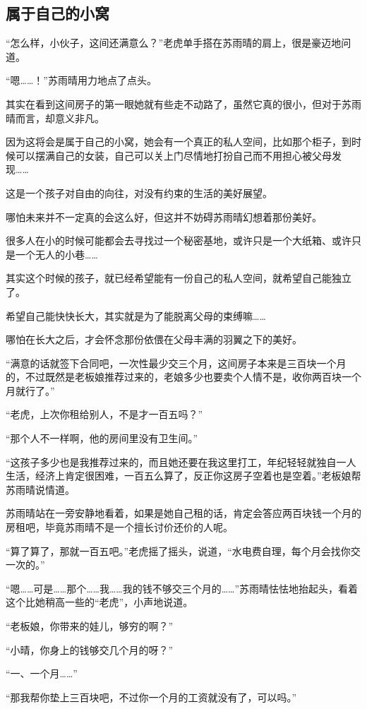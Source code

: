 \subsection{属于自己的小窝}

“怎么样，小伙子，这间还满意么？”老虎单手搭在苏雨晴的肩上，很是豪迈地问道。

“嗯……！”苏雨晴用力地点了点头。

其实在看到这间房子的第一眼她就有些走不动路了，虽然它真的很小，但对于苏雨晴而言，却意义非凡。

因为这将会是属于自己的小窝，她会有一个真正的私人空间，比如那个柜子，到时候可以摆满自己的女装，自己可以关上门尽情地打扮自己而不用担心被父母发现……

这是一个孩子对自由的向往，对没有约束的生活的美好展望。

哪怕未来并不一定真的会这么好，但这并不妨碍苏雨晴幻想着那份美好。

很多人在小的时候可能都会去寻找过一个秘密基地，或许只是一个大纸箱、或许只是一个无人的小巷……

其实这个时候的孩子，就已经希望能有一份自己的私人空间，就希望自己能独立了。

希望自己能快快长大，其实就是为了能脱离父母的束缚嘛……

哪怕在长大之后，才会怀念那份依偎在父母丰满的羽翼之下的美好。

“满意的话就签下合同吧，一次性最少交三个月，这间房子本来是三百块一个月的，不过既然是老板娘推荐过来的，老娘多少也要卖个人情不是，收你两百块一个月就行了。”

“老虎，上次你租给别人，不是才一百五吗？”

“那个人不一样啊，他的房间里没有卫生间。”

“这孩子多少也是我推荐过来的，而且她还要在我这里打工，年纪轻轻就独自一人生活，经济上肯定很困难，一百五么算了，反正你这房子空着也是空着。”老板娘帮苏雨晴说情道。

苏雨晴站在一旁安静地看着，如果是她自己租的话，肯定会答应两百块钱一个月的房租吧，毕竟苏雨晴不是一个擅长讨价还价的人呢。

“算了算了，那就一百五吧。”老虎摇了摇头，说道，“水电费自理，每个月会找你交一次的。”

“嗯……可是……那个……我……我的钱不够交三个月的……”苏雨晴怯怯地抬起头，看着这个比她稍高一些的“老虎”，小声地说道。

“老板娘，你带来的娃儿，够穷的啊？”

“小晴，你身上的钱够交几个月的呀？”

“一、一个月……”

“那我帮你垫上三百块吧，不过你一个月的工资就没有了，可以吗。”

